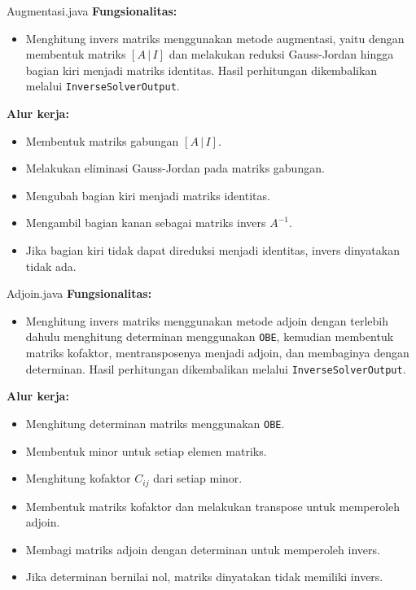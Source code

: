 \begin{kelas}{Augmentasi.java}
\textbf{Fungsionalitas:}
\begin{itemize}
\item Menghitung invers matriks menggunakan metode augmentasi, yaitu dengan membentuk matriks $[A\,|\,I]$ dan melakukan reduksi Gauss-Jordan hingga bagian kiri menjadi matriks identitas. Hasil perhitungan dikembalikan melalui \texttt{InverseSolverOutput}.
\end{itemize}

\textbf{Alur kerja:}
\begin{itemize}
\item Membentuk matriks gabungan $[A\,|\,I]$.
\item Melakukan eliminasi Gauss-Jordan pada matriks gabungan.
\item Mengubah bagian kiri menjadi matriks identitas.
\item Mengambil bagian kanan sebagai matriks invers $A^{-1}$.
\item Jika bagian kiri tidak dapat direduksi menjadi identitas, invers dinyatakan tidak ada.
\end{itemize}

\end{kelas}

\begin{kelas}{Adjoin.java}
\textbf{Fungsionalitas:}
\begin{itemize}
\item Menghitung invers matriks menggunakan metode adjoin dengan terlebih dahulu menghitung determinan menggunakan \texttt{OBE}, kemudian membentuk matriks kofaktor, mentransposenya menjadi adjoin, dan membaginya dengan determinan. Hasil perhitungan dikembalikan melalui \texttt{InverseSolverOutput}.
\end{itemize}

\textbf{Alur kerja:}
\begin{itemize}
\item Menghitung determinan matriks menggunakan \texttt{OBE}.
\item Membentuk minor untuk setiap elemen matriks.
\item Menghitung kofaktor $C_{ij}$ dari setiap minor.
\item Membentuk matriks kofaktor dan melakukan transpose untuk memperoleh adjoin.
\item Membagi matriks adjoin dengan determinan untuk memperoleh invers.
\item Jika determinan bernilai nol, matriks dinyatakan tidak memiliki invers.
\end{itemize}

\end{kelas}

